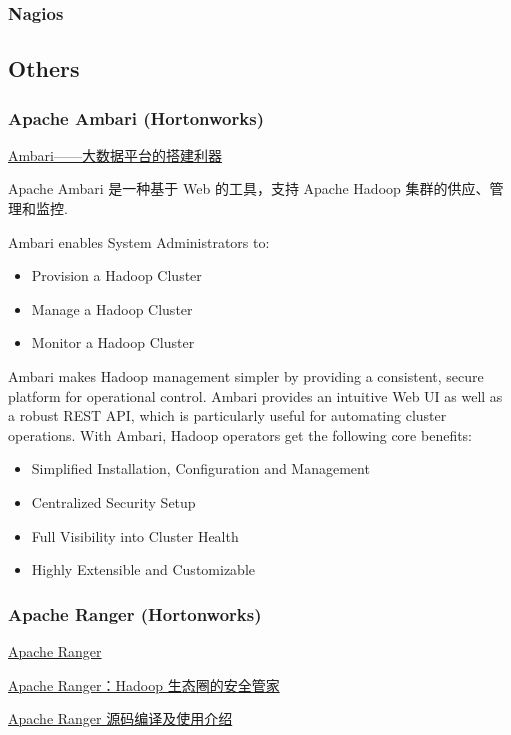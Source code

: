 \documentclass[hyperref, UTF-8]{ctexart}
\begin{document}
\subsubsection{Nagios}
\label{sec:org9183aca}
\subsection{Others}
\label{sec:org3462e07}
\subsubsection{Apache Ambari (Hortonworks)}
\label{sec:orgda0ea69}
\href{https://www.ibm.com/developerworks/cn/opensource/os-cn-bigdata-ambari/}{Ambari——大数据平台的搭建利器}   

Apache Ambari 是一种基于 Web 的工具，支持 Apache Hadoop 集群的供应、管理和监控.   

Ambari enables System Administrators to:
\begin{itemize}
\item Provision a Hadoop Cluster
\item Manage a Hadoop Cluster
\item Monitor a Hadoop Cluster
\end{itemize}
Ambari makes Hadoop management simpler by providing a consistent, secure platform for operational control. Ambari provides an intuitive Web UI as well as a robust REST API, which is particularly useful for automating cluster operations. With Ambari, Hadoop operators get the following core benefits:
\begin{itemize}
\item Simplified Installation, Configuration and Management
\item Centralized Security Setup
\item Full Visibility into Cluster Health
\item Highly Extensible and Customizable
\end{itemize}

\subsubsection{Apache Ranger (Hortonworks)}
\label{sec:org38300ef}
\href{http://ranger.apache.org}{Apache Ranger}   

\href{http://www.sohu.com/a/146259668\_465944}{Apache Ranger：Hadoop 生态圈的安全管家}   

\href{http://shenliang1985.blog.163.com/blog/static/2908380520151126102050593/}{Apache Ranger 源码编译及使用介绍}   
\end{document}
